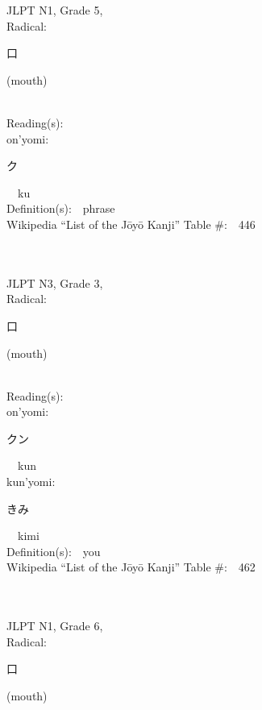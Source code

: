 \begin{multicols}{2}
{JLPT N1, Grade 5, \\Radical:\ \ {\begin{CJK}{UTF8}{min} 口 \end{CJK}} (mouth) } \\
Reading(s):\ \ \\
{\hspace*{1em}}on'yomi:\ \ \\
{\hspace*{2em}}{\begin{CJK}{UTF8}{min} ク \end{CJK}}\ \ ku\ \ \\
Definition(s):\ \ phrase \\
Wikipedia ``List of the J\=oy\=o Kanji'' Table \#:\ \ 446 \\
\ \ \\
{\fontsize{34pt}{40pt}  }\ \ \\  %
{JLPT N3, Grade 3, \\Radical:\ \ {\begin{CJK}{UTF8}{min} 口 \end{CJK}} (mouth) } \\
Reading(s):\ \ \\
{\hspace*{1em}}on'yomi:\ \ \\
{\hspace*{2em}}{\begin{CJK}{UTF8}{min} クン \end{CJK}}\ \ kun\ \ \\
{\hspace*{1em}}kun'yomi:\ \ \\
{\hspace*{2em}}{\begin{CJK}{UTF8}{min} きみ \end{CJK}}\ \ kimi\ \ \\
Definition(s):\ \ you \\
Wikipedia ``List of the J\=oy\=o Kanji'' Table \#:\ \ 462 \\
\ \ \\
{\fontsize{34pt}{40pt}  }\ \ \\  %
{JLPT N1, Grade 6, \\Radical:\ \ {\begin{CJK}{UTF8}{min} 口 \end{CJK}} (mouth) } \\

\end{multicols}
